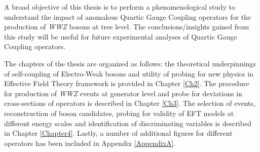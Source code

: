 A broad objective of this thesis is to perform a phenomenological study to understand the impact of anomalous Quartic Gauge Coupling operators for the production of \textit{WWZ} bosons at tree level. The conclusions/insights gained from this study will be useful for future experimental analyses of Quartic Gauge Coupling operators.

The chapters of the thesis are organized as follows: the theoretical underpinnings of self-coupling of Electro-Weak bosons and utility of probing for new physics in Effective Field Theory framework is provided in Chapter \ref{Ch2}. The procedure for production of \textit{WWZ} events at generator level and probe for deviations in cross-sections of operators is described in Chapter \ref{Ch3}. The selection of events, reconstruction of boson candidates, probing for validity of EFT models at different energy scales and identification of discriminating variables is described in Chapter \ref{Chapter4}. Lastly, a number of additional figures for different operators has been included in Appendix \ref{AppendixA}.  
